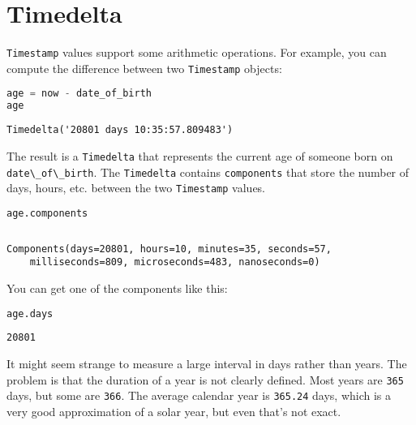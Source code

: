 \hypertarget{timedelta}{%
\section{Timedelta}\label{timedelta}}

\passthrough{\lstinline!Timestamp!} values support some arithmetic
operations. For example, you can compute the difference between two
\passthrough{\lstinline!Timestamp!} objects:

\begin{lstlisting}[language=Python,style=source]
age = now - date_of_birth
age
\end{lstlisting}

\begin{lstlisting}[style=output]
Timedelta('20801 days 10:35:57.809483')
\end{lstlisting}

The result is a \passthrough{\lstinline!Timedelta!} that represents the
current age of someone born on
\passthrough{\lstinline!date\_of\_birth!}. The
\passthrough{\lstinline!Timedelta!} contains
\passthrough{\lstinline!components!} that store the number of days,
hours, etc. between the two \passthrough{\lstinline!Timestamp!} values.

\begin{lstlisting}[language=Python,style=source]
age.components
\end{lstlisting}

\begin{lstlisting}[language=Python,style=source]
\end{lstlisting}

\begin{lstlisting}[style=output]
Components(days=20801, hours=10, minutes=35, seconds=57,
    milliseconds=809, microseconds=483, nanoseconds=0)
\end{lstlisting}

You can get one of the components like this:

\begin{lstlisting}[language=Python,style=source]
age.days
\end{lstlisting}

\begin{lstlisting}[style=output]
20801
\end{lstlisting}

It might seem strange to measure a large interval in days rather than
years. The problem is that the duration of a year is not clearly
defined. Most years are \passthrough{\lstinline!365!} days, but some are
\passthrough{\lstinline!366!}. The average calendar year is
\passthrough{\lstinline!365.24!} days, which is a very good
approximation of a solar year, but even that's not exact.

